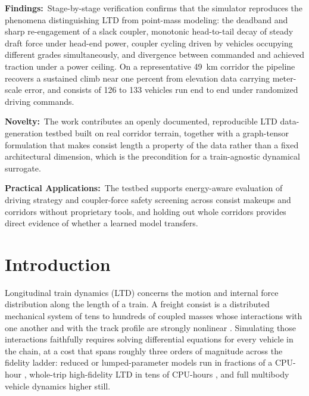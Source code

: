 \documentclass[numbered]{trbunofficial}
\begin{document}
\vspace{0.25\baselineskip}
\noindent\textbf{Findings:}~Stage-by-stage verification confirms that the simulator reproduces the phenomena distinguishing LTD from point-mass modeling: the deadband and sharp re-engagement of a slack coupler, monotonic head-to-tail decay of steady draft force under head-end power, coupler cycling driven by vehicles occupying different grades simultaneously, and divergence between commanded and achieved traction under a power ceiling. On a representative 49~km corridor the pipeline recovers a sustained climb near one percent from elevation data carrying meter-scale error, and consists of 126 to 133 vehicles run end to end under randomized driving commands.

\vspace{0.25\baselineskip}
\noindent\textbf{Novelty:}~The work contributes an openly documented, reproducible LTD data-generation testbed built on real corridor terrain, together with a graph-tensor formulation that makes consist length a property of the data rather than a fixed architectural dimension, which is the precondition for a train-agnostic dynamical surrogate.

\vspace{0.25\baselineskip}
\noindent\textbf{Practical Applications:}~The testbed supports energy-aware evaluation of driving strategy and coupler-force safety screening across consist makeups and corridors without proprietary tools, and holding out whole corridors provides direct evidence of whether a learned model transfers.

\newpage

\section{Introduction}\label{sec:intro}

Longitudinal train dynamics (LTD) concerns the motion and internal force distribution along the length of a train. A freight consist is a distributed mechanical system of tens to hundreds of coupled masses whose interactions with one another and with the track profile are strongly nonlinear \citep{Cole2006HandbookLTD}. Simulating those interactions faithfully requires solving differential equations for every vehicle in the chain, at a cost that spans roughly three orders of magnitude across the fidelity ladder: reduced or lumped-parameter models run in fractions of a CPU-hour \citep{perez2016reduced}, whole-trip high-fidelity LTD in tens of CPU-hours \citep{wu2019highfidelity}, and full multibody vehicle dynamics higher still.
\end{document}
